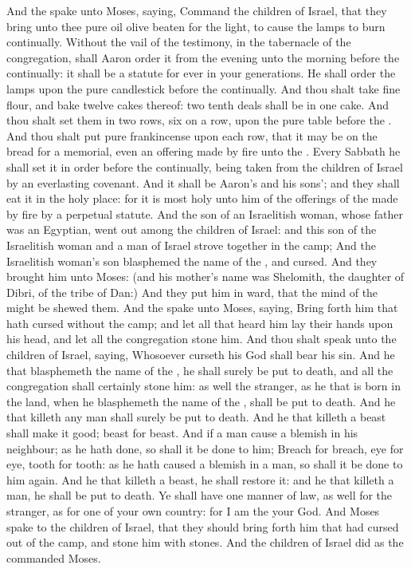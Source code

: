 \begin{biblechapter} %
 And the \LORD spake unto Moses, saying,
\verse Command the children of Israel, that they bring unto thee pure oil olive beaten for the light, to cause the lamps to burn continually.
\verse Without the vail of the testimony, in the tabernacle of the congregation, shall Aaron order it from the evening unto the morning before the \LORD continually: it shall be a statute for ever in your generations.
\verse He shall order the lamps upon the pure candlestick before the \LORD continually.
\verse And thou shalt take fine flour, and bake twelve cakes thereof: two tenth deals shall be in one cake.
\verse And thou shalt set them in two rows, six on a row, upon the pure table before the \LORD.
\verse And thou shalt put pure frankincense upon each row, that it may be on the bread for a memorial, even an offering made by fire unto the \LORD.
\verse Every Sabbath he shall set it in order before the \LORD continually, being taken from the children of Israel by an everlasting covenant.
\verse And it shall be Aaron's and his sons'; and they shall eat it in the holy place: for it is most holy unto him of the offerings of the \LORD made by fire by a perpetual statute.
 And the son of an Israelitish woman, whose father was an Egyptian, went out among the children of Israel: and this son of the Israelitish woman and a man of Israel strove together in the camp;
\verse And the Israelitish woman's son blasphemed the name of the \LORD, and cursed. And they brought him unto Moses: (and his mother's name was Shelomith, the daughter of Dibri, of the tribe of Dan:)
\verse And they put him in ward, that the mind of the \LORD might be shewed them.
\verse And the \LORD spake unto Moses, saying,
\verse Bring forth him that hath cursed without the camp; and let all that heard him lay their hands upon his head, and let all the congregation stone him.
\verse And thou shalt speak unto the children of Israel, saying, Whosoever curseth his God shall bear his sin.
\verse And he that blasphemeth the name of the \LORD, he shall surely be put to death, and all the congregation shall certainly stone him: as well the stranger, as he that is born in the land, when he blasphemeth the name of the \LORD, shall be put to death.
\verse And he that killeth any man shall surely be put to death.
\verse And he that killeth a beast shall make it good; beast for beast.
\verse And if a man cause a blemish in his neighbour; as he hath done, so shall it be done to him;
\verse Breach for breach, eye for eye, tooth for tooth: as he hath caused a blemish in a man, so shall it be done to him again.
\verse And he that killeth a beast, he shall restore it: and he that killeth a man, he shall be put to death.
\verse Ye shall have one manner of law, as well for the stranger, as for one of your own country: for I am the \LORD your God.
\verse And Moses spake to the children of Israel, that they should bring forth him that had cursed out of the camp, and stone him with stones. And the children of Israel did as the \LORD commanded Moses.
\end{biblechapter}

